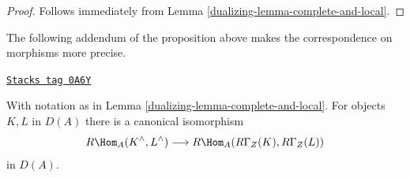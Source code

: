 \begin{proof}

Follows immediately from Lemma \ref{dualizing-lemma-complete-and-local}.
\end{proof}

The following addendum of the proposition above makes the
correspondence on morphisms more precise.

\begin{lemma}
\label{dualizing-lemma-compare-RHom}
\href{https://stacks.math.columbia.edu/tag/0A6Y}{\texttt{Stacks tag 0A6Y}}

With notation as in Lemma \ref{dualizing-lemma-complete-and-local}.
For objects $K, L$ in $D(A)$ there is a canonical isomorphism
$$
R\Hom_A(K^\wedge, L^\wedge) \longrightarrow R\Hom_A(R\Gamma_Z(K), R\Gamma_Z(L))
$$
in $D(A)$.
\end{lemma}

